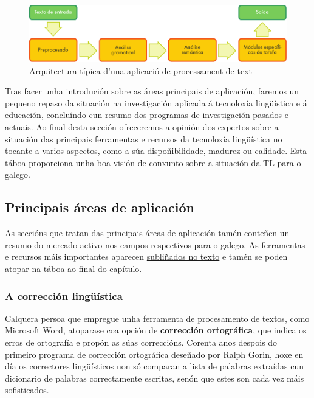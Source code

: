 \begin{multicols}{2}
\begin{figure}[b]
  \center
  \vspace{-5mm} \includegraphics[width=\textwidth]{../_media/galician/text_processing_app_architecture}
  \caption{Arquitectura típica d'una aplicació de processament de text}
  \label{fig:textprocessingarch_ca}
\end{figure}

Tras facer unha introdución sobre as áreas principais de aplicación, faremos un pequeno repaso da situación na investigación aplicada á tecnoloxía lingüística e á educación, concluíndo cun resumo dos programas de investigación pasados e actuais. Ao final desta sección ofreceremos a opinión dos expertos sobre a situación das principais ferramentas e recursos da tecnoloxía lingüística no tocante a varios aspectos, como a súa dispoñibilidade, madurez ou calidade. Esta táboa proporciona unha boa visión de conxunto sobre a situación da TL para o galego.

\subsection{Principais áreas de aplicación} 

 As seccións que tratan das principais áreas de aplicación tamén conteñen un resumo do mercado activo nos campos respectivos para o galego. As ferramentas e recursos máis importantes aparecen \underline{subliñados no texto} e tamén se poden atopar na táboa ao final do capítulo.

\subsubsection{A corrección lingüística}

   Calquera persoa que empregue unha ferramenta de procesamento de textos, como Microsoft Word, atoparase coa opción de \textbf{corrección ortográfica}, que indica os erros de ortografía e propón as súas correccións. Corenta anos despois do primeiro programa de corrección ortográfica deseñado por Ralph Gorin, hoxe en día os correctores lingüísticos non só comparan a lista de palabras extraídas cun dicionario de palabras correctamente escritas, senón que estes son cada vez máis sofisticados.


\end{multicols}

